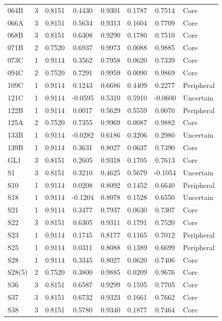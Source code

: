 {\begin{longtable}{@{}lccccccl@{}}
  064B & 3 & 0.8151 & 0.4430 & 0.9301 & 0.1787 & 0.7514 & Core \\
  066A & 3 & 0.8151 & 0.5634 & 0.9313 & 0.1604 & 0.7709 & Core \\
  068B & 3 & 0.8151 & 0.6308 & 0.9290 & 0.1780 & 0.7510 & Core \\
  071B & 2 & 0.7520 & 0.6937 & 0.9973 & 0.0088 & 0.9885 & Core \\
  073C & 1 & 0.9114 & 0.3562 & 0.7958 & 0.0620 & 0.7339 & Core \\
  094C & 2 & 0.7520 & 0.7291 & 0.9959 & 0.0090 & 0.9869 & Core \\
  109C & 1 & 0.9114 & 0.1243 & 0.6686 & 0.4409 & 0.2277 & Peripheral \\
  121C & 1 & 0.9114 & -0.0595 & 0.5310 & 0.5910 & -0.0600 & Uncertain \\
  122B & 1 & 0.9114 & 0.0017 & 0.5629 & 0.5559 & 0.0070 & Peripheral \\
  125A & 2 & 0.7520 & 0.7355 & 0.9969 & 0.0087 & 0.9882 & Core \\
  133B & 1 & 0.9114 & -0.0282 & 0.6186 & 0.3206 & 0.2980 & Uncertain \\
  139B & 1 & 0.9114 & 0.3631 & 0.8027 & 0.0637 & 0.7390 & Core \\
  GL1 & 3 & 0.8151 & 0.2605 & 0.9318 & 0.1705 & 0.7613 & Core \\
  S1 & 3 & 0.8151 & 0.3210 & 0.4625 & 0.5679 & -0.1054 & Uncertain \\
  S10 & 1 & 0.9114 & 0.0208 & 0.8092 & 0.1452 & 0.6640 & Peripheral \\
  S18 & 1 & 0.9114 & -0.1204 & 0.8078 & 0.1528 & 0.6550 & Uncertain \\
  S21 & 1 & 0.9114 & 0.3477 & 0.7937 & 0.0630 & 0.7307 & Core \\
  S22 & 3 & 0.8151 & 0.6305 & 0.9311 & 0.1791 & 0.7520 & Core \\
  S23 & 1 & 0.9114 & 0.1745 & 0.8177 & 0.1165 & 0.7012 & Peripheral \\
  S25 & 1 & 0.9114 & 0.0311 & 0.8088 & 0.1389 & 0.6699 & Peripheral \\
  S28 & 1 & 0.9114 & 0.3345 & 0.8027 & 0.0620 & 0.7406 & Core \\
  S28(5) & 2 & 0.7520 & 0.3800 & 0.9885 & 0.0209 & 0.9676 & Core \\
  S36 & 3 & 0.8151 & 0.6587 & 0.9299 & 0.1595 & 0.7705 & Core \\
  S37 & 3 & 0.8151 & 0.6732 & 0.9323 & 0.1661 & 0.7662 & Core \\
  S38 & 3 & 0.8151 & 0.5780 & 0.9340 & 0.1877 & 0.7464 & Core \\

\end{longtable}}
